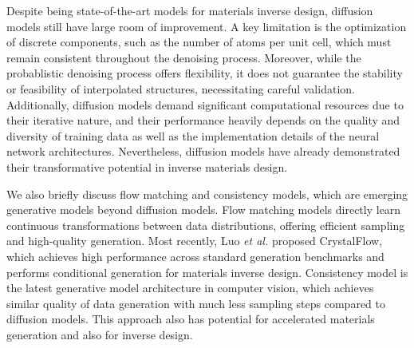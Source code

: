 \documentclass[fleqn,10pt]{wlscirep}
\begin{document}
Despite being state-of-the-art models for materials inverse design, diffusion models still have large room of improvement. A key limitation is the optimization of discrete components, such as the number of atoms per unit cell, which must remain consistent throughout the denoising process. Moreover, while the probablistic denoising process offers flexibility, it does not guarantee the stability or feasibility of interpolated structures, necessitating careful validation. Additionally, diffusion models demand significant computational resources due to their iterative nature, and their performance heavily depends on the quality and diversity of training data as well as the implementation details of the neural network architectures. Nevertheless, diffusion models have already demonstrated their transformative potential in inverse materials design.

We also briefly discuss flow matching\cite{lipman2022flow} and consistency models\cite{song2023consistency}, which are emerging generative models beyond diffusion models. Flow matching models directly learn continuous transformations between data distributions, offering efficient sampling and high-quality generation. Most recently, Luo \textit{et al.} proposed CrystalFlow, which achieves high performance across standard generation benchmarks and performs conditional generation for materials inverse design\cite{luo2024crystalflow}. Consistency model is the latest generative model architecture in computer vision, which achieves similar quality of data generation with much less sampling steps compared to diffusion models. This approach also has potential for accelerated materials generation and also for inverse design.
\end{document}
